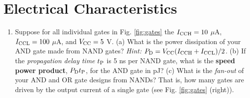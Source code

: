 \documentclass{article}
\begin{document}
\section{Electrical Characteristics}

\begin{enumerate}
\item Suppose for all individual gates in Fig. \ref{fig:gates} the $I_{\rm CCH} = 10$ $\mu$A, $I_{\rm CCL} = 100$ $\mu$A, and $V_{\rm CC} = 5$ V. (a) What is the power dissipation of your AND gate made from NAND gates? \textit{Hint: $P_{\rm D} = V_{\rm CC}(I_{\rm CCH} + I_{\rm CCL})/2$.} (b) If the \textit{propagation delay time} $t_{\rm P}$ is 5 ns per NAND gate, what is the \textbf{speed power product}, $P_{\rm D}t_{\rm P}$, for the AND gate in pJ? (c) What is the \textit{fan-out} of your AND and OR gate designs from NANDs?  That is, how many gates are driven by the output current of a single gate (see Fig. \ref{fig:gates} (right)).
\end{enumerate}
\end{document}
